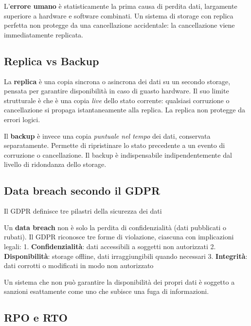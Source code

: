 \documentclass[
  italian,
  openany]{book}
\begin{document}
L'\textbf{errore umano} è statisticamente la prima causa di perdita
dati, largamente superiore a hardware e software combinati. Un sistema
di storage con replica perfetta non protegge da una cancellazione
accidentale: la cancellazione viene immediatamente replicata.

\subsection{Replica vs Backup}\label{replica-vs-backup}

La \textbf{replica} è una copia sincrona o asincrona dei dati su un
secondo storage, pensata per garantire disponibilità in caso di guasto
hardware. Il suo limite strutturale è che è una copia \emph{live} dello
stato corrente: qualsiasi corruzione o cancellazione si propaga
istantaneamente alla replica. La replica non protegge da errori logici.

Il \textbf{backup} è invece una copia \emph{puntuale nel tempo} dei
dati, conservata separatamente. Permette di ripristinare lo stato
precedente a un evento di corruzione o cancellazione. Il backup è
indispensabile indipendentemente dal livello di ridondanza dello
storage.

\subsection{Data breach secondo il
GDPR}\label{data-breach-secondo-il-gdpr}

\begin{calloutwarning}{Il GDPR definisce tre pilastri della sicurezza dei dati}

Un \textbf{data breach} non è solo la perdita di confidenzialità (dati
pubblicati o rubati). Il GDPR riconosce tre forme di violazione,
ciascuna con implicazioni legali: 1. \textbf{Confidenzialità}: dati
accessibili a soggetti non autorizzati 2. \textbf{Disponibilità}:
storage offline, dati irraggiungibili quando necessari 3.
\textbf{Integrità}: dati corrotti o modificati in modo non autorizzato

Un sistema che non può garantire la disponibilità dei propri dati è
soggetto a sanzioni esattamente come uno che subisce una fuga di
informazioni.

\end{calloutwarning}

\subsection{RPO e RTO}\label{rpo-e-rto}
\end{document}
